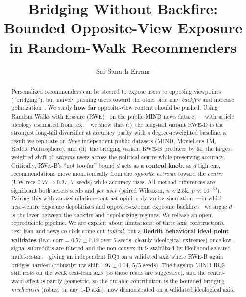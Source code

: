 \documentclass[sigconf,nonacm]{acmart}
\begin{document}
\title{Bridging Without Backfire: Bounded Opposite-View Exposure in
Random-Walk Recommenders}

\author{Sai Sanath Erram}

\begin{abstract}
Personalized recommenders can be steered to expose users to opposing viewpoints
(``bridging''), but naively pushing users toward the other side may
\emph{backfire} and increase polarization~\cite{bail2018exposure}. We study
\textbf{how far} opposite-view content should be pushed. Using Random Walks with
Erasure (RWE)~\cite{paudel2021rwe} on the public MIND news
dataset~\cite{wu2020mind}---with article ideology estimated from text---we show
that (i)~the long-tail variant RWE-D is the strongest long-tail diversifier at
accuracy parity with a degree-reweighted baseline, a result we replicate on
\emph{three} independent public datasets (MIND, MovieLens-1M, Reddit Politosphere),
and (ii)~the bridging variant RWE-B produces by far the largest
weighted shift of \emph{extreme} users across the political centre while
preserving accuracy. Critically, RWE-B's ``not too far'' bound $d$ acts as a
\textbf{control knob}: as $d$ tightens, recommendations move monotonically from
the \emph{opposite extreme} toward the \emph{centre} (UW-recs $0.77\to0.27$,
7~seeds) while accuracy rises. All method differences are significant both across
seeds and \emph{per user} (paired Wilcoxon, $n\approx2.5$k, $p\ll10^{-60}$).
Pairing this with an assimilation--contrast opinion-dynamics
simulation~\cite{chen2021opinion}---in which near-centre exposure depolarizes and
opposite-extreme exposure backfires---we argue $d$ is the lever between the
backfire and depolarizing regimes. We release an open, reproducible pipeline. We
are explicit about limitations: of three axis constructions, text-lean and news
co-click come out \emph{topical}, but a \textbf{Reddit behavioral ideal point
validates} ($\mathrm{lean\_corr}=0.57\pm0.19$ over 5 seeds, cleanly ideological
extremes) once low-signal subreddits are filtered and the non-convex fit is
stabilized by likelihood-selected multi-restart---giving an independent RQ3 on a
validated axis where RWE-B again bridges hardest (robustly: $\mathrm{uw\_shift}\
1.97\pm0.04$, $5/5$ seeds). The flagship MIND RQ3 still rests on the weak
text-lean axis (so those reads are suggestive), and the centre-ward effect is partly
geometric, so the durable contribution is the bounded-bridging \emph{mechanism}
(robust on any 1-D axis), now demonstrated on a validated ideological axis.
\end{abstract}
\end{document}
